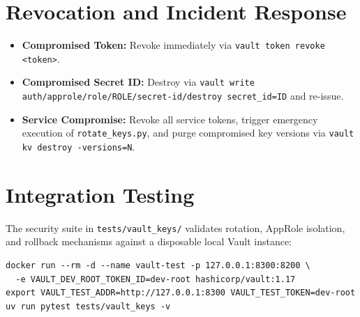 \documentclass[11pt,a4paper]{article}
\begin{document}
\section{Revocation and Incident Response}
\begin{itemize}[leftmargin=*,itemsep=2pt]
  \item \textbf{Compromised Token:} Revoke immediately via \texttt{vault token revoke <token>}.
  \item \textbf{Compromised Secret ID:} Destroy via \texttt{vault write auth/approle/role/ROLE/secret-id/destroy secret\_id=ID} and re-issue.
  \item \textbf{Service Compromise:} Revoke all service tokens, trigger emergency execution of \texttt{rotate\_keys.py}, and purge compromised key versions via \texttt{vault kv destroy -versions=N}.
\end{itemize}

\section{Integration Testing}
The security suite in \texttt{tests/vault\_keys/} validates rotation, AppRole isolation, and rollback mechanisms against a disposable local Vault instance:
\begin{lstlisting}
docker run --rm -d --name vault-test -p 127.0.0.1:8300:8200 \
  -e VAULT_DEV_ROOT_TOKEN_ID=dev-root hashicorp/vault:1.17
export VAULT_TEST_ADDR=http://127.0.0.1:8300 VAULT_TEST_TOKEN=dev-root
uv run pytest tests/vault_keys -v
\end{lstlisting}
\end{document}

